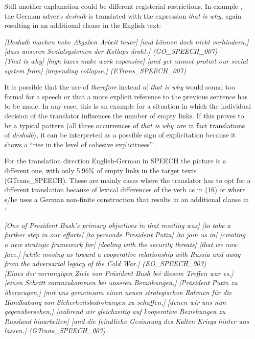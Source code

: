 \documentclass[output=paper]{LSP/langsci}
\begin{document}
\newpage 
Still another explanation could be different registerial restrictions. In example , the German adverb \textit{deshalb} is translated with the expression \textit{that is why}, again resulting in an additional clause in the English text: 


\ea \label{ex:culo:15}
   \ea \textit{[Deshalb machen hohe Abgaben Arbeit teuer] [und können doch nicht verhindern,]   [dass unseren Sozialsystemen der Kollaps droht.] \textup{(GO\_SPEECH\_007)}}\\
   \ex \textit{[That is why] [high taxes make work expensive] [and yet cannot protect our social system from] [impending collapse.] \textup{(ETrans\_SPEECH\_007)}}
   \z
\z

It is possible that the use of \textit{therefore} instead of \textit{that is why} would sound too formal for a speech or that a more explicit reference to the previous sentence has to be made. In any case, this is an example for a situation in which the individual decision of the translator influences the number of empty links. If this proves to be a typical pattern (all three occurrences of \textit{that is why}~are in fact translations of \textit{deshalb}), it can be interpreted as a possible sign of explicitation because it shows a ``rise in the level of cohesive explicitness'' \citep[19]{Blum-Kulka1986}. 

For the translation direction English-German in SPEECH the picture is a different one, with only 5.96\% of empty links in the target texts (GTrans\_SPEECH). These are mainly cases where the translator has to opt for a different translation because of lexical differences of the verb as in (16) or where s/he uses a German non-finite construction that results in an additional clause in :

\ea \label{ex:culo:16}
   \ea \textit{[One of President Bush's primary objectives in that meeting was] [to take a further step in our efforts] [to persuade President Putin] [to join us in] [creating a new strategic   framework for] [dealing with the security threats] [that we now face,] [while moving us   toward a cooperative relationship with Russia and away from the adversarial legacy of the Cold War.] \textup{(EO\_SPEECH\_003)}}\\
    \ex \textit{[Eines der vorrangigen Ziele von Präsident Bush bei diesem Treffen war es,] [einen   Schritt voranzukommen bei unseren Bemühungen,] [Präsident Putin zu überzeugen,] [mit uns gemeinsam einen neuen strategischen Rahmen für die Handhabung von   Sicherheitsbedrohungen zu schaffen,] [denen wir uns nun gegenübersehen,] [während wir gleichzeitig auf kooperative Beziehungen zu Russland hinarbeiten] [und die feindliche Gesinnung des Kalten Kriegs hinter uns lassen.] \textup{(GTrans\_SPEECH\_003)}}
    \z
\z
\end{document}
